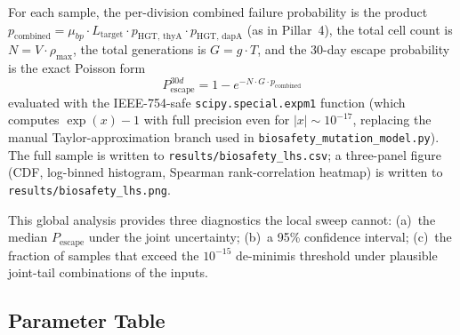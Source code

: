 \documentclass[10pt,twocolumn,letterpaper,
              colorlinks=true,
              linkcolor=blue!70!black,
              citecolor=blue!70!black,
              urlcolor=blue!70!black,
              pdfborder={0 0 0}]{article}
\begin{document}
For each sample, the per-division combined failure probability is the
product
$p_{\text{combined}} = \mu_{bp} \cdot L_{\text{target}} \cdot
p_{\text{HGT, thyA}} \cdot p_{\text{HGT, dapA}}$
(as in Pillar~4), the total cell count is $N = V \cdot \rho_{\max}$,
the total generations is $G = g \cdot T$, and the 30-day escape
probability is the exact Poisson form
\begin{equation}
  P_{\text{escape}}^{30d} = 1 - e^{-N \cdot G \cdot p_{\text{combined}}}
\end{equation}
evaluated with the IEEE-754-safe \texttt{scipy.special.expm1} function
(which computes $\exp(x) - 1$ with full precision even for
$|x| \sim 10^{-17}$, replacing the manual Taylor-approximation branch
used in \texttt{biosafety\_mutation\_model.py}). The full sample is
written to \texttt{results/biosafety\_lhs.csv}; a three-panel figure
(CDF, log-binned histogram, Spearman rank-correlation heatmap) is
written to \texttt{results/biosafety\_lhs.png}.

This global analysis provides three diagnostics the local sweep cannot:
(a)~the median $P_{\text{escape}}$ under the joint uncertainty;
(b)~a 95\% confidence interval; (c)~the fraction of samples that exceed
the $10^{-15}$ de-minimis threshold under plausible joint-tail
combinations of the inputs.

\subsection{Parameter Table}
\end{document}
